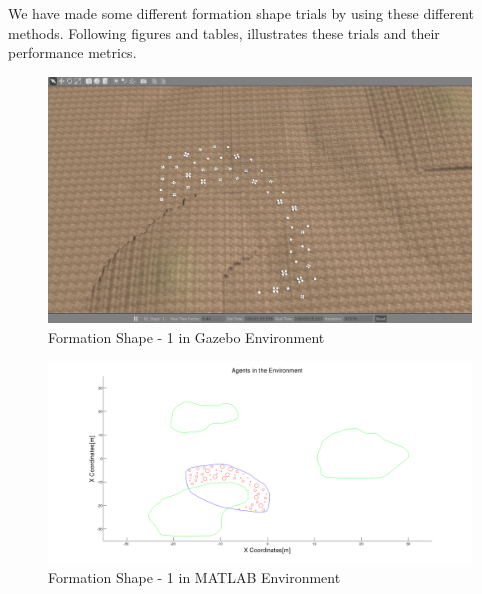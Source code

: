 We have made some different formation shape trials by using these different methods. Following figures and tables, illustrates these trials and their performance metrics.

\begin{figure}[H]
\caption{Formation Shape - 1 in Gazebo Environment}
\centerline{\includegraphics[scale = 0.32]{1_Gazebo}}
\end{figure} 
			
\begin{figure}[H]
\caption{Formation Shape - 1 in MATLAB Environment}
\centerline{\includegraphics[scale = 0.32]{1}}
\end{figure} 
			

